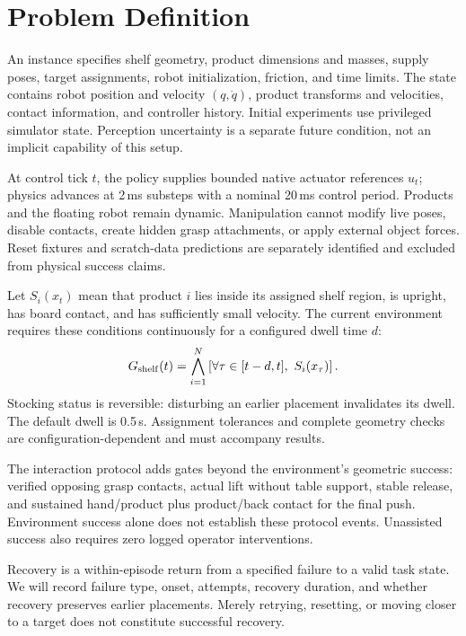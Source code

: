 \section{Problem Definition}
An instance specifies shelf geometry, product dimensions and masses, supply
poses, target assignments, robot initialization, friction, and time limits.
The state contains robot position and velocity $(q,\dot q)$, product transforms
and velocities, contact information, and controller history. Initial experiments
use privileged simulator state. Perception uncertainty is a separate future
condition, not an implicit capability of this setup.

At control tick $t$, the policy supplies bounded native actuator references
$u_t$; physics advances at 2\,ms substeps with a nominal 20\,ms control period.
Products and the floating robot remain dynamic. Manipulation cannot modify
live poses, disable contacts, create hidden grasp attachments, or apply external
object forces. Reset fixtures and scratch-data predictions are separately
identified and excluded from physical success claims.

Let $S_i(x_t)$ mean that product $i$ lies inside its assigned shelf region,
is upright, has board contact, and has sufficiently small velocity. The current
environment requires these conditions continuously for a configured dwell time
$d$:
\begin{equation}
 G_{\rm shelf}(t) = \bigwedge_{i=1}^{N}
 \left[\forall\tau\in[t-d,t],\ S_i(x_\tau)\right].
\end{equation}
Stocking status is reversible: disturbing an earlier placement invalidates its
dwell. The default dwell is 0.5\,s. Assignment tolerances and complete geometry
checks are configuration-dependent and must accompany results.

The interaction protocol adds gates beyond the environment's geometric success:
verified opposing grasp contacts, actual lift without table support, stable
release, and sustained hand/product plus product/back contact for the final push.
Environment success alone does not establish these protocol events. Unassisted
success also requires zero logged operator interventions.

Recovery is a within-episode return from a specified failure to a valid task
state. We will record failure type, onset, attempts, recovery duration, and
whether recovery preserves earlier placements. Merely retrying, resetting, or
moving closer to a target does not constitute successful recovery.
